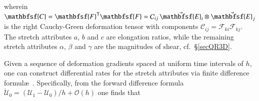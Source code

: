 wherein $\mathbfsf{C} = \mathbfsf{F}^{\mathsf{T}} \mathbfsf{F} = \mathcal{C}_{ij} \, \vec{\mathbfsf{E}}_i \otimes \vec{\mathbfsf{E}}_j$ is the right Cauchy-Green deformation tensor with components $\mathcal{C}_{ij} = \mathcal{F}_{ki} \mathcal{F}_{{kj}}$.  The stretch attributes $a$, $b$ and $c$ are elongation ratios, while the remaining stretch attributes $\alpha$, $\beta$ and $\gamma$ are the magnitudes of shear, cf.\ \S\ref{secQR3D}. 

Given a sequence of deformation gradients spaced at uniform time intervals of $h$, one can construct differential rates for the stretch attributes via finite difference formul\ae\ \cite{FreedZamani18}.  Specifically, from the forward difference formula $\dot{\boldsymbol{\mathcal{U}}}_0 = ( \boldsymbol{\mathcal{U}}_1 - \boldsymbol{\mathcal{U}}_0 ) / h + \mathcal{O}(h)$ one finds that
